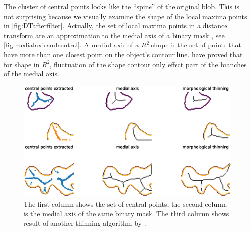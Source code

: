 The cluster of central points looks like the ``spine'' of the original blob. This is not surprising because we visually examine the shape of the local maxima points in \autoref{fig:DTafterfilter}. Actually, the set of local maxima points in a distance transform are an approximation to the medial axis of a binary mask \cite{lee1996chessboard}, see \autoref{fig:medialaxisandcentral}. A medial axis of a $R^2$ shape is the set of points that have more than one closest point on the object's contour line. \citeauthor{attali2009stability} \cite{attali2009stability} have proved that for shape in $R^2$, fluctuation of the shape contour only effect part of the branches of the medial axis.
\begin{figure}
  \centering
  \includegraphics[width=\textwidth]{figures/centralandmedial.eps}
  \caption{The first column shows the set of central points, the second column is the medial axis of the same binary mask. The third column shows result of another thinning algorithm by \cite{zhang1984fast}.}\label{fig:medialaxisandcentral}
\end{figure}



